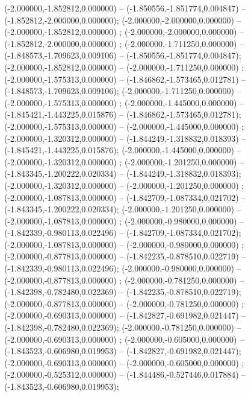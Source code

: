  (-2.000000,-1.852812,0.000000) -- (-1.850556,-1.851774,0.004847) -- (-1.852812,-2.000000,0.000000);
 (-2.000000,-2.000000,0.000000) -- (-2.000000,-1.852812,0.000000) ;
 (-2.000000,-2.000000,0.000000) -- (-1.852812,-2.000000,0.000000) ;
 (-2.000000,-1.711250,0.000000) -- (-1.848573,-1.709623,0.009106) -- (-1.850556,-1.851774,0.004847);
 (-2.000000,-1.852812,0.000000) -- (-2.000000,-1.711250,0.000000) ;
 (-2.000000,-1.575313,0.000000) -- (-1.846862,-1.573465,0.012781) -- (-1.848573,-1.709623,0.009106);
 (-2.000000,-1.711250,0.000000) -- (-2.000000,-1.575313,0.000000) ;
 (-2.000000,-1.445000,0.000000) -- (-1.845421,-1.443225,0.015876) -- (-1.846862,-1.573465,0.012781);
 (-2.000000,-1.575313,0.000000) -- (-2.000000,-1.445000,0.000000) ;
 (-2.000000,-1.320312,0.000000) -- (-1.844249,-1.318832,0.018393) -- (-1.845421,-1.443225,0.015876);
 (-2.000000,-1.445000,0.000000) -- (-2.000000,-1.320312,0.000000) ;
 (-2.000000,-1.201250,0.000000) -- (-1.843345,-1.200222,0.020334) -- (-1.844249,-1.318832,0.018393);
 (-2.000000,-1.320312,0.000000) -- (-2.000000,-1.201250,0.000000) ;
 (-2.000000,-1.087813,0.000000) -- (-1.842709,-1.087334,0.021702) -- (-1.843345,-1.200222,0.020334);
 (-2.000000,-1.201250,0.000000) -- (-2.000000,-1.087813,0.000000) ;
 (-2.000000,-0.980000,0.000000) -- (-1.842339,-0.980113,0.022496) -- (-1.842709,-1.087334,0.021702);
 (-2.000000,-1.087813,0.000000) -- (-2.000000,-0.980000,0.000000) ;
 (-2.000000,-0.877813,0.000000) -- (-1.842235,-0.878510,0.022719) -- (-1.842339,-0.980113,0.022496);
 (-2.000000,-0.980000,0.000000) -- (-2.000000,-0.877813,0.000000) ;
 (-2.000000,-0.781250,0.000000) -- (-1.842398,-0.782480,0.022369) -- (-1.842235,-0.878510,0.022719);
 (-2.000000,-0.877813,0.000000) -- (-2.000000,-0.781250,0.000000) ;
 (-2.000000,-0.690313,0.000000) -- (-1.842827,-0.691982,0.021447) -- (-1.842398,-0.782480,0.022369);
 (-2.000000,-0.781250,0.000000) -- (-2.000000,-0.690313,0.000000) ;
 (-2.000000,-0.605000,0.000000) -- (-1.843523,-0.606980,0.019953) -- (-1.842827,-0.691982,0.021447);
 (-2.000000,-0.690313,0.000000) -- (-2.000000,-0.605000,0.000000) ;
 (-2.000000,-0.525312,0.000000) -- (-1.844486,-0.527446,0.017884) -- (-1.843523,-0.606980,0.019953);
